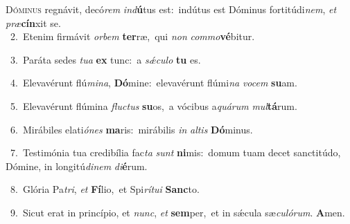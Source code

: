 \lettrine{\initial\textcolor{\initialcolor}{D}}{óminus} regnávit, decó\textit{rem} \textit{ind}\-\textbf{ú}tus est:~\star indútus est Dóminus fortitúdi\-\textit{nem}\-, \textit{et} \textit{præ}\-\textbf{cín}xit se.\\
{\numbfont\textcolor{\numbcolor}{~2.}}~Etenim firmávit \textit{or}\-\textit{bem} \textbf{ter}\-ræ,~\star qui \textit{non} \textit{com}\-\textit{mo}\textbf{vé}bitur.\par
{\numbfont\textcolor{\numbcolor}{~3.}}~Paráta sedes \textit{tu}\-\textit{a} \textbf{ex} tunc:~\star a \textit{sǽ}\-\textit{cu}\textit{lo} \textbf{tu} es.\par
{\numbfont\textcolor{\numbcolor}{~4.}}~Elevavérunt flú\-\textit{mi}\-\textit{na}, \textbf{Dó}\-mine:~\star elevavérunt flúmi\textit{na} \textit{vo}\-\textit{cem} \textbf{su}\-am.\par
{\numbfont\textcolor{\numbcolor}{~5.}}~Elevavérunt flúmina \textit{fluc}\-\textit{tus} \textbf{su}\-os,~\star a vócibus a\-\textit{quá}\-\textit{rum} \textit{mul}\-\textbf{tá}rum.\par
{\numbfont\textcolor{\numbcolor}{~6.}}~Mirábiles elati\-\textit{ó}\-\textit{nes} \textbf{ma}\-ris:~\star mirábilis \textit{in} \textit{al}\-\textit{tis} \textbf{Dó}\-minus.\par
{\numbfont\textcolor{\numbcolor}{~7.}}~Testimónia tua credibília fac\textit{ta} \textit{sunt} \textbf{ni}\-mis:~\star domum tuam decet sanctitúdo, Dómine, in longitú\-\textit{di}\-\textit{nem} \textit{di}\-\textbf{é}rum.\par
{\numbfont\textcolor{\numbcolor}{~8.}}~Glória Pa\-\textit{tri}\-, \textit{et} \textbf{Fí}\-lio,~\star et Spi\-\textit{rí}\-\textit{tu}\textit{i} \textbf{Sanc}\-to.\par
{\numbfont\textcolor{\numbcolor}{~9.}}~Sicut erat in princípio, et \textit{nunc}\-, \textit{et} \textbf{sem}\-per,~\star et in sǽcula sæ\-\textit{cu}\-\textit{ló}\textit{rum}. \textbf{A}\-men.\par
